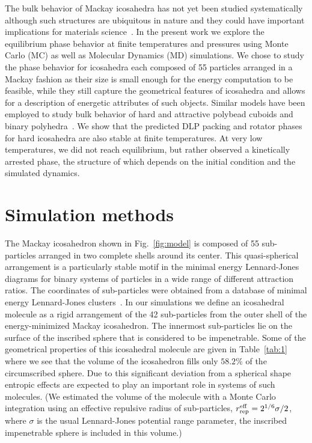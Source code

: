 \documentclass[10pt,aps,pre,twocolumn,superscriptaddress,amsmath,amssymb]{revtex4-1}
\begin{document}
The bulk behavior of Mackay icosahedra has not yet been studied systematically although such structures are ubiquitous in nature and they could have important implications for materials science~\cite{Lu2013,Nagel2017}.
In the present work we explore the equilibrium phase behavior at finite temperatures and pressures using Monte Carlo (MC) as well as Molecular Dynamics (MD) simulations.
We chose to study the phase behavior for icosahedra each composed of 55 particles arranged in a Mackay fashion as their size is small enough for the energy computation to be feasible, while they still capture the geometrical features of icosahedra and allows for a description of energetic attributes of such objects.
Similar models have been employed to study bulk behavior of hard and attractive polybead cuboids and binary polyhedra~\cite{John2005,Khadilkar2012}.
We show that the predicted DLP packing and rotator phases for hard icosahedra are also stable at finite temperatures.
At very low temperatures, we did not reach equilibrium, but rather observed a kinetically arrested phase, the structure of which depends on the initial condition and the simulated dynamics.

\section{Simulation methods}

The Mackay icosahedron shown in Fig.~\ref{fig:model} is composed of 55 sub-particles arranged in two complete shells around its center.
This quasi-spherical arrangement is a particularly stable motif in the minimal energy Lennard-Jones diagrams for binary systems of particles in a wide range of different attraction ratios. The coordinates of sub-particles were obtained from a database of minimal energy Lennard-Jones clusters~\cite{Mravlak2016}.
In our simulations we define an icosahedral molecule as a rigid arrangement of the 42 sub-particles from the outer shell of the energy-minimized Mackay icosahedron. The innermost sub-particles lie on the surface of the inscribed sphere that is considered to be impenetrable.
%
Some of the geometrical properties of this icosahedral molecule are given in Table~\ref{tab:1} where we see that the volume of the icosahedron fills only $58.2\%$ of the circumscribed sphere.
Due to this significant deviation from a spherical shape entropic effects are expected to play an important role in systems of such molecules.
(We estimated the volume of the molecule with a Monte Carlo integration using an effective repulsive radius of sub-particles, $r_{\rm rep}^{\rm eff}=2^{1/6}\sigma/2$, where $\sigma$ is the usual Lennard-Jones potential range parameter, the inscribed impenetrable sphere is included in this volume.)
\end{document}
